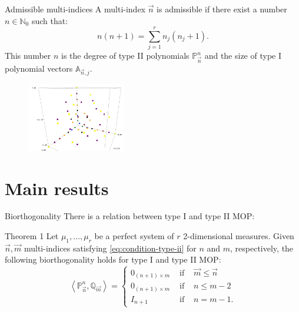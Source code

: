 \documentclass[compress,aspectratio=169]{beamer}
\newcommand{\N}[0]{\mathbb{N}}
\newcommand{\prodesc}[2]{\left\langle #1 , #2 \right\rangle}
\begin{document}
  \begin{frame}{Admissible multi-indices}
	A multi-index $\vec n$ is \alert{admissible} if there exist a number $n\in\N_0$ such that:
	\begin{equation}
		\label{eq:condition-type-ii}
		\boxed{n(n+1) = \sum_{j=1}^r n_j (n_j+1).}
	\end{equation}
	This number $n$ is the degree of type II polynomials $\mathbb P_{\vec n}^n$ and the size of type I polynomial vectors $\mathbb A_{\vec n,j}$.
		\begin{figure}[h]
			\includegraphics[height=3cm]{./Images/puntos3D.png} \\
		  \label{fig:indices}
		\end{figure}
	
  \end{frame}

  \section*{Main results}

  \begin{frame}{Biorthogonality}
	There is a relation between type I and type II MOP:
\begin{block}{Theorem 1}
  Let $\mu_1,\dots,\mu_r$ be a perfect system of $r$ 2-dimensional measures. Given $\vec n, \vec m$ multi-indices satisfying \eqref{eq:condition-type-ii} for $n$ and $m$, respectively, the following biorthogonality holds for type I and type II MOP:
  \begin{equation}
      \boxed{\prodesc{\mathbb P_{\vec n}^n}{\mathbb Q_{\vec m}} = \left\{\begin{array}{ccl}
          0_{(n+1)\times m} &   \text{ if } & \vec m \leq \vec n \\
          0_{(n+1)\times m} &   \text{ if } &  n \leq m -2 \\
          I_{n+1} & \text{ if } & n=m-1. 
      \end{array}\right.}
  \end{equation}
\end{block}
	
	
  \end{frame}
\end{document}

